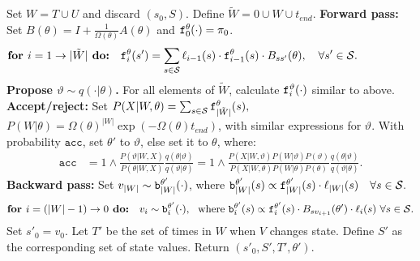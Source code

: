 \begin{algorithm}[H]
\begin{algorithmic}[1]
      \State 
      Set $W = T \cup U$ and discard $(s_0,S)$. Define $\tilde{W} = 0 \cup W \cup t_{end}$.
    \State 
    \textbf{Forward pass:}
    Set $B(\theta) = I + \frac{1}{\Omega(\theta)}A(\theta)$ and
    $\mathtt{f}^\theta_0(\cdot) = \pi_0$.
\vspace{-.1in}
    $$\textbf{for } i=1\rightarrow |\tilde{W}|\textbf{ do:} \quad \mathtt{f}^{\theta}_i(s') = \sum_{s \in {\mathcal S}} \ell_{i-1}(s) \cdot \mathtt{f}^\theta_{i-1}(s)\cdot B_{ss'}(\theta), \quad \forall s' \in {\mathcal S}.\qquad\qquad\quad $$
    \State \textbf{Propose $\vartheta \sim q(\cdot| \theta)$.}
    For all elements of $\tilde{W}$, calculate $\mathtt{f}^\vartheta_i(\cdot)$ similar to above.
      \State \textbf{Accept/reject:} 
      Set $P(X|W,\theta) = \sum_{s \in {\mathcal S}} \mathtt{f}_{|\tilde{W}|}^\theta(s),$ $P(W|\theta) = \Omega(\theta)^{|W|}\exp(-\Omega(\theta)t_{end})$, with similar expressions for $\vartheta$. 
      With probability $\texttt{acc}$, set $\theta'$ to $\vartheta$, else set it to $\theta$, where: %
          \begin{align}
            \label{eq:ncp_acc}
            \texttt{acc} &=  1 \wedge \frac{P(\vartheta|W, X)}{P(\theta|W, X)} \frac{q(\theta|\vartheta)}{q(\vartheta|\theta)}
          =  1 \wedge \frac{P(X| W,\vartheta) P(W | \vartheta)P(\vartheta)}
            {P(X|W, \theta)P(W | \theta)P(\theta)} \frac{q(\theta|\vartheta)}{q(\vartheta|\theta)}.
          \end{align}
    \State %
    \textbf{Backward pass:}
    Set $v_{|W|} \sim \mathtt{b}^{\theta'}_{|W|}(\cdot)$, where $\mathtt{b}^{\theta'}_{|W|}(s) \propto \mathtt{f}^{\theta'}_{|W|}(s)\cdot\ell_{|W|}(s) \quad \forall s \in {\mathcal S}.$ 
\vspace{-.1in}
    $$ \textbf{for } i=(|W|-1)\rightarrow 0\textbf{ do:} \quad v_i \sim \mathtt{b}^{\theta'}_i(\cdot),\ \ \text{where } 
    \mathtt{b}^{\theta'}_i(s) \propto \mathtt{f}^{\theta'}_i(s)\cdot B_{sv_{i+1}}(\theta') \cdot \ell_i(s)  \ \forall s \in {\mathcal S}.$$
    \State Set $s'_0=v_0$. Let $T'$ be the set of times in $W$ when $V$ changes state. Define $S'$ as the corresponding set of state values. Return $(s'_0, S', T', \theta')$.
\end{algorithmic}
\end{algorithm}

